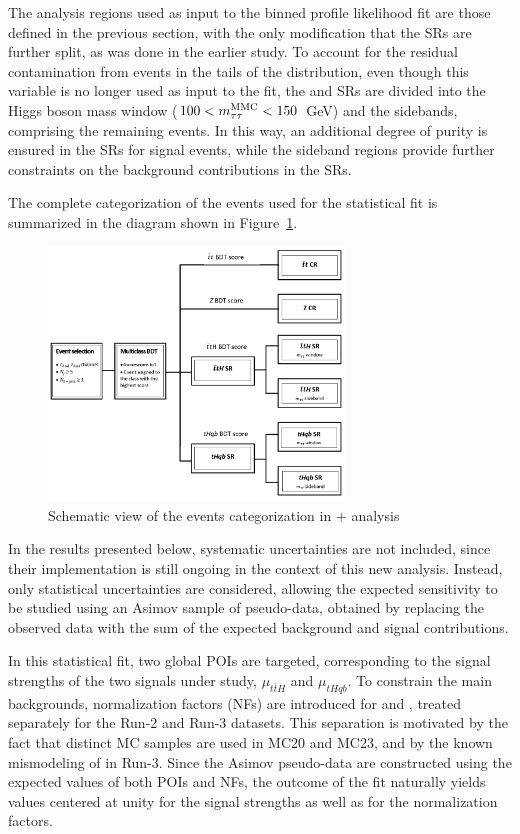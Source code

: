 The analysis regions used as input to the binned profile likelihood fit are those defined in the previous section, with the only modification that the SRs are further split, as was done in the earlier study. To account for the residual contamination from \ttbar events in the tails of the \mmc distribution, even though this variable is no longer used as input to the fit, the \ttH and \thqb SRs are divided into the Higgs boson mass window ($100 < m^\text{MMC}_{\tau\tau} < 150$~GeV) and the sidebands, comprising the remaining events. In this way, an additional degree of purity is ensured in the SRs for signal events, while the sideband regions provide further constraints on the background contributions in the SRs.

The complete categorization of the events used for the statistical fit is summarized in the diagram shown in Figure~\ref{analysis_diagram}.
\begin{figure}[htbp]
  \centering
  \includegraphics[width=0.7\textwidth]{images/analysis_diagram.png}
    \caption{Schematic view of the events categorization in \tH + \ttH analysis}
    \label{analysis_diagram}
  \end{figure}

In the results presented below, systematic uncertainties are not included, since their implementation is still ongoing in the context of this new analysis. Instead, only statistical uncertainties are considered, allowing the expected sensitivity to be studied using an Asimov sample of pseudo-data, obtained by replacing the observed data with the sum of the expected background and signal contributions.

In this statistical fit, two global POIs are targeted, corresponding to the signal strengths of the two signals under study, $\mu_{t\bar{t}H}$ and $\mu_{tHqb}$. To constrain the main backgrounds, normalization factors (NFs) are introduced for \ztautau and \ttbar, treated separately for the Run-2 and Run-3 datasets. This separation is motivated by the fact that distinct \ttbar MC samples are used in MC20 and MC23, and by the known mismodeling of \ztautau in Run-3. Since the Asimov pseudo-data are constructed using the expected values of both POIs and NFs, the outcome of the fit naturally yields values centered at unity for the signal strengths as well as for the normalization factors.

